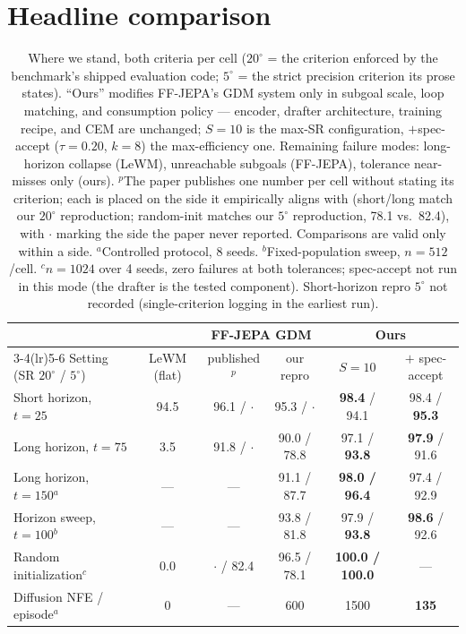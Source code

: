 \documentclass[11pt]{article}
\newcommand{\ours}[1]{\textbf{#1}}
\newcommand{\degc}[1]{$#1^\circ$}
\begin{document}
\section{Headline comparison}

\begin{table}[h]
\centering
\small
\setlength{\tabcolsep}{5pt}
\begin{tabular}{lccccc}
\toprule
& & \multicolumn{2}{c}{FF-JEPA GDM} & \multicolumn{2}{c}{\ours{Ours}} \\
\cmidrule(lr){3-4}\cmidrule(lr){5-6}
Setting (SR \degc{20} / \degc{5}) & LeWM (flat) & published$^{p}$ & our repro & $S{=}10$ & $+$ spec-accept \\
\midrule
Short horizon, $t{=}25$ & 94.5 & 96.1 / $\cdot$ & 95.3 / $\cdot$ & \ours{98.4} / 94.1 & 98.4 / \ours{95.3} \\
Long horizon, $t{=}75$ & 3.5 & 91.8 / $\cdot$ & 90.0 / 78.8 & 97.1 / \ours{93.8} & \ours{97.9} / 91.6 \\
Long horizon, $t{=}150$$^{a}$ & --- & --- & 91.1 / 87.7 & \ours{98.0 / 96.4} & 97.4 / 92.9 \\
Horizon sweep, $t{=}100$$^{b}$ & --- & --- & 93.8 / 81.8 & 97.9 / \ours{93.8} & \ours{98.6} / 92.6 \\
Random initialization$^{c}$ & 0.0 & $\cdot$ / 82.4 & 96.5 / 78.1 & \ours{100.0 / 100.0} & --- \\
\midrule
Diffusion NFE / episode$^{a}$ & 0 & --- & 600 & 1500 & \ours{135} \\
\bottomrule
\end{tabular}
\caption{Where we stand, both criteria per cell (\degc{20} = the criterion enforced
by the benchmark's shipped evaluation code; \degc{5} = the strict precision
criterion its prose states). ``Ours'' modifies FF-JEPA's GDM system only in subgoal
scale, loop matching, and consumption policy --- encoder, drafter architecture,
training recipe, and CEM are unchanged; $S{=}10$ is the max-SR configuration,
$+$spec-accept ($\tau{=}0.20$, $k{=}8$) the max-efficiency one. Remaining failure
modes: long-horizon collapse (LeWM), unreachable subgoals (FF-JEPA), tolerance
near-misses only (ours).
$^{p}$The paper publishes one number per cell without stating its criterion; each
is placed on the side it empirically aligns with (short/long match our \degc{20}
reproduction; random-init matches our \degc{5} reproduction, 78.1 vs.\ 82.4), with
$\cdot$ marking the side the paper never reported. Comparisons are valid only
within a side. $^{a}$Controlled protocol, 8 seeds. $^{b}$Fixed-population sweep,
$n{=}512$/cell. $^{c}$$n{=}1024$ over 4 seeds, zero failures at both tolerances;
spec-accept not run in this mode (the drafter is the tested component).
Short-horizon repro \degc{5} not recorded (single-criterion logging in the
earliest run).}
\end{table}
\end{document}
